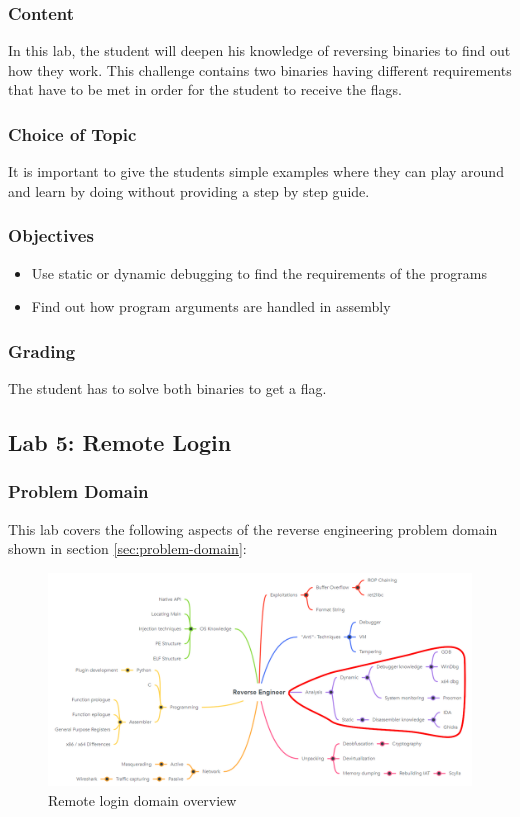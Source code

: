 \subsubsection*{Content}
In this lab, the student will deepen his knowledge of reversing binaries to find out how they work. This challenge contains two binaries having different requirements that have to be met in order for the student to receive the flags.
\subsubsection*{Choice of Topic}
It is important to give the students simple examples where they can play around and learn by doing without providing a step by step guide.
\subsubsection*{Objectives}
\begin{itemize}
    \item Use static or dynamic debugging to find the requirements of the programs
    \item Find out how program arguments are handled in assembly
\end{itemize}
\subsubsection*{Grading}
The student has to solve both binaries to get a flag.
\pagebreak

\subsection{Lab 5: Remote Login}
\subsubsection*{Problem Domain}
This lab covers the following aspects of the reverse engineering problem domain shown in section \ref{sec:problem-domain}:
\vspace{-2ex}
\begin{figure}[H]
    \includegraphics[width=\textwidth]{resources/remotelogin-overview-light.png}
    \caption{Remote login domain overview}
    \label{fig:remotelogin-overview}
\end{figure}
